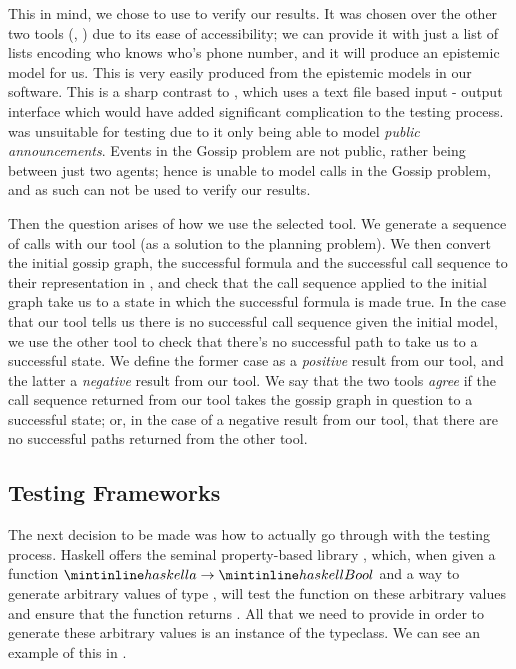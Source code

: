 \documentclass[10pt, a4paper]{report}
\begin{document}
This in mind, we chose to use \cite{GithubGossip} to verify our results. It was
chosen over the other two tools (\cite{SMCDEL}, \cite{DEMO-S5}) due to its ease
of accessibility; we can provide it with just a list of lists encoding who knows
who's phone number, and it will produce an epistemic model for us. This is very
easily produced from the epistemic models in our software. This is a sharp
contrast to \cite{SMCDEL}, which uses a text file based input - output interface
which would have added significant complication to the testing process.
\cite{DEMO-S5} was unsuitable for testing due to it only being able to model
\emph{public announcements}. Events in the Gossip problem are not public, rather
being between just two agents; hence \cite{DEMO-S5} is unable to model calls in
the Gossip problem, and as such can not be used to verify our results.

Then the question arises of how we use the selected tool. We generate a sequence
of calls with our tool (as a solution to the planning problem). We then convert
the initial gossip graph, the successful formula and the successful call
sequence to their representation in \cite{GithubGossip}, and check that the call
sequence applied to the initial graph take us to a state in which the successful
formula is made true. In the case that our tool tells us there is no successful
call sequence given the initial model, we use the other tool to check that
there's no successful path to take us to a successful state. We define the
former case as a \emph{positive} result from our tool, and the latter a
\emph{negative} result from our tool. We say that the two tools \emph{agree} if
the call sequence returned from our tool takes the gossip graph in question to a
successful state; or, in the case of a negative result from our tool, that there
are no successful paths returned from the other tool.

\subsection{Testing Frameworks}
\label{sec:TestingFrameworks}

The next decision to be made was how to actually go through with the testing
process. Haskell offers the seminal property-based library ,
which, when given a function $\mih{a} \rightarrow \mih{Bool}$ and a way to
generate arbitrary values of type , will test the function on these
arbitrary values and ensure that the function returns . All that we need
to provide in order to generate these arbitrary values is an instance of the
 typeclass. We can see an example of this in .
\end{document}
